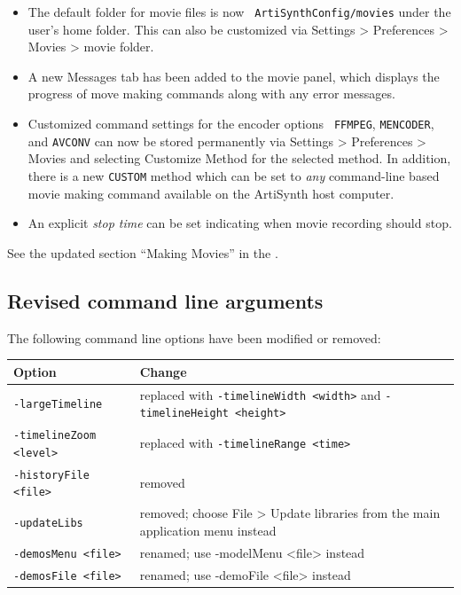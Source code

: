 \documentclass{article}
\begin{document}
\begin{itemize}

\item The default folder for movie files is now {\tt
ArtiSynthConfig/movies} under the user's home folder.  This can also
be customized via {\sf Settings > Preferences > Movies > movie folder}.

\item A new {\sf Messages} tab has been added to the movie panel,
which displays the progress of move making commands along with any
error messages.

\item Customized command settings for the encoder options {\tt
FFMPEG}, {\tt MENCODER}, and {\tt AVCONV} can now be stored
permanently via {\sf Settings > Preferences > Movies} and selecting
{\sf Customize Method} for the selected method. In addition, there is
a new {\tt CUSTOM} method which can be set to {\it any} command-line
based movie making command available on the ArtiSynth host computer.

\item An explicit {\it stop time} can be set indicating when movie
recording should stop.

\end{itemize}

See the updated section ``Making Movies'' in the
.

\subsection*{Revised command line arguments}

The following command line options have been modified or removed:

\begin{center}
\begin{tabular}{|ll|}
\hline
Option & Change \\
\hline
{\tt -largeTimeline} & replaced with {\tt -timelineWidth <width>} and {
\tt -timelineHeight <height>} \\
{\tt -timelineZoom <level>} & replaced with {\tt -timelineRange <time>}\\
{\tt -historyFile <file>} & removed\\
{\tt -updateLibs} & removed; choose {\sf File > Update libraries} 
from the main application menu instead\\
{\tt -demosMenu <file>} & renamed; use {\sf -modelMenu <file>} instead\\
{\tt -demosFile <file>} & renamed; use {\sf -demoFile <file>} instead\\
\hline
\end{tabular}
\end{center}
\end{document}
